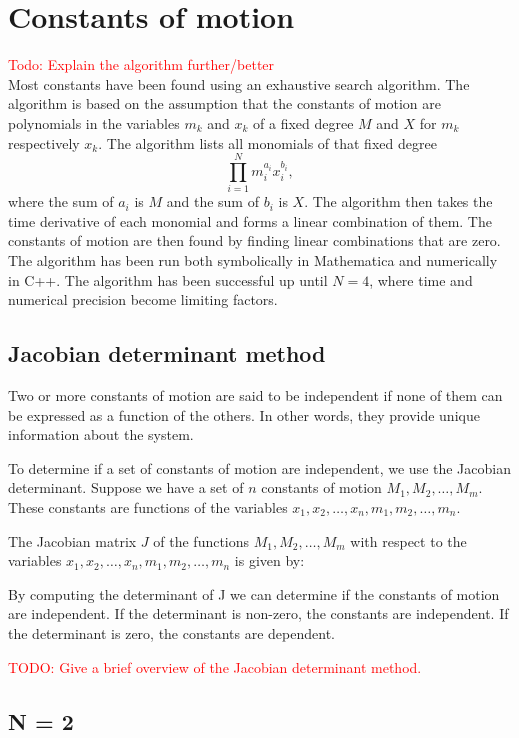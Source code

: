 \documentclass[english,master]{liumaiex}
\theoremstyle{plain}
\theoremstyle{definition}
\newcommand\todo[1]{\textcolor{red}{#1}}
\begin{document}
\section{Constants of motion}

\todo{Todo: Explain the algorithm further/better}\\
Most constants have been found using an exhaustive search algorithm. The algorithm is based on the assumption that the constants of motion are polynomials in the variables $m_k$ and $x_k$ of a fixed degree $M$ and $X$ for $m_k$ respectively $x_k$. The algorithm lists all monomials of that fixed degree
\begin{equation}
	\prod_{i=1}^{N} m_i^{a_i} x_i^{b_i},
\end{equation}
where the sum of $a_i$ is $M$ and the sum of $b_i$ is $X$. The algorithm then takes the time derivative of each monomial and forms a linear combination of them. The constants of motion are then found by finding linear combinations that are zero. The algorithm has been run both symbolically in Mathematica and numerically in C++. The algorithm has been successful up until $N = 4$, where time and numerical precision become limiting factors.

\subsection{Jacobian determinant method}
Two or more constants of motion are said to be independent if none of them can be expressed as a function of the others. In other words, they provide unique information about the system.

To determine if a set of constants of motion are independent, we use the Jacobian determinant. Suppose we have a set of $n$ constants of motion ${M_1,M_2,\dots,M_m}$. These constants are functions of the variables ${x_1,x_2,\dots,x_n,m_1,m_2,\dots,m_n}$.

The Jacobian matrix $J$ of the functions ${M_1,M_2,\dots,M_m}$ with respect to the variables ${x_1,x_2,\dots,x_n,m_1,m_2,\dots,m_n}$ is given by:

By computing the determinant of J we can determine if the constants of motion are independent. If the determinant is non-zero, the constants are independent. If the determinant is zero, the constants are dependent.

\todo{TODO: Give a brief overview of the Jacobian determinant method.}

\subsection*{N = 2}
\end{document}
